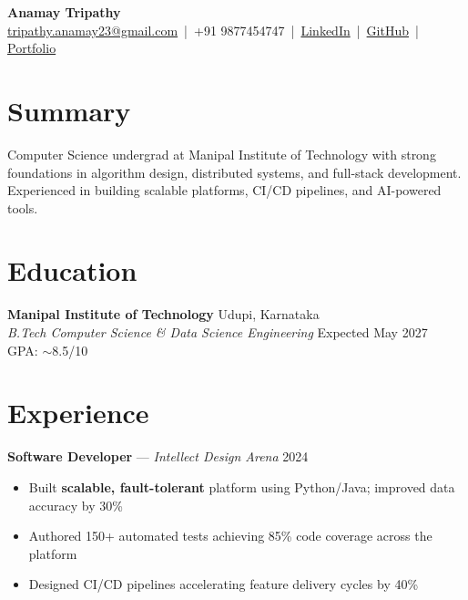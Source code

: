 \documentclass[letterpaper,10pt]{article}
\begin{document}
\begin{center}
    {\LARGE \textbf{Anamay Tripathy}} \\[2pt]
    \small
    \href{mailto:tripathy.anamay23@gmail.com}{tripathy.anamay23@gmail.com} \,|\,
    +91 9877454747 \,|\,
    \href{https://www.linkedin.com/in/anamay-tripathy-b53829296/}{LinkedIn} \,|\,
    \href{https://github.com/Flamechargerr}{GitHub} \,|\,
    \href{https://anamay.vercel.app/}{Portfolio}
\end{center}

\section{Summary}
Computer Science undergrad at Manipal Institute of Technology with strong foundations in
algorithm design, distributed systems, and full-stack development. Experienced in building
scalable platforms, CI/CD pipelines, and AI-powered tools.

\section{Education}
\textbf{Manipal Institute of Technology} \hfill Udupi, Karnataka \\
\textit{B.Tech Computer Science \& Data Science Engineering} \hfill Expected May 2027 \\
GPA: $\sim$8.5/10

\section{Experience}

\textbf{Software Developer} — \textit{Intellect Design Arena} \hfill 2024
\begin{itemize}
\item Built \textbf{scalable, fault-tolerant} platform using Python/Java; improved data accuracy by 30\%
\item Authored 150+ automated tests achieving 85\% code coverage across the platform
\item Designed CI/CD pipelines accelerating feature delivery cycles by 40\%
\end{itemize}
\end{document}
